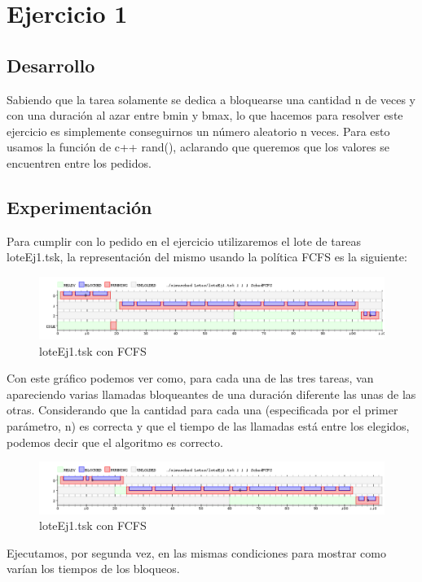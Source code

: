 
\section{Ejercicio 1}


\subsection{Desarrollo}
Sabiendo que la tarea solamente se dedica a bloquearse una cantidad n de veces y con una duración al azar entre bmin y bmax, lo que hacemos para resolver este ejercicio es 
simplemente conseguirnos un número aleatorio n veces. Para esto usamos la función de c++ rand(), aclarando que queremos que los valores se encuentren entre los pedidos.

\subsection{Experimentación}
Para cumplir con lo pedido en el ejercicio utilizaremos el lote de tareas loteEj1.tsk, la representación del mismo usando la política FCFS es la siguiente:


\begin{figure}[H]
  \centering
    \includegraphics[width=1.1\textwidth]{imagenes/Ex1Ej1.png}
  \caption{loteEj1.tsk con FCFS}
\end{figure}

Con este gráfico podemos ver como, para cada una de las tres tareas, van apareciendo varias llamadas bloqueantes de una duración diferente las unas de las otras. Considerando 
que la cantidad para cada una (especificada por el primer parámetro, n) es correcta y que el tiempo de las llamadas está entre los elegidos, podemos decir que el algoritmo es correcto.

\begin{figure}[H]
  \centering
    \includegraphics[width=1.1\textwidth]{imagenes/Ex2Ej1.png}
  \caption{loteEj1.tsk con FCFS}
\end{figure}

Ejecutamos, por segunda vez, en las mismas condiciones para mostrar como varían los tiempos de los bloqueos.